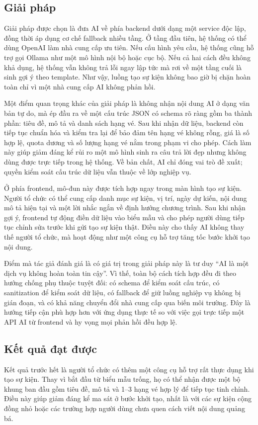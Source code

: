 \documentclass[../DoAn.tex]{subfiles}
\begin{document}
\subsection{Giải pháp}
Giải pháp được chọn là đưa AI về phía backend dưới dạng một service độc lập, đồng thời áp dụng cơ chế fallback nhiều tầng. Ở tầng đầu tiên, hệ thống có thể dùng OpenAI làm nhà cung cấp ưu tiên. Nếu cấu hình yêu cầu, hệ thống cũng hỗ trợ gọi Ollama như một mô hình nội bộ hoặc cục bộ. Nếu cả hai cách đều không khả dụng, hệ thống vẫn không trả lỗi ngay lập tức mà rơi về một tầng cuối là sinh gợi ý theo template. Như vậy, luồng tạo sự kiện không bao giờ bị chặn hoàn toàn chỉ vì một nhà cung cấp AI không phản hồi.

Một điểm quan trọng khác của giải pháp là không nhận nội dung AI ở dạng văn bản tự do, mà ép đầu ra về một cấu trúc \gls{JSON} có schema rõ ràng gồm ba thành phần: tiêu đề, mô tả và danh sách hạng vé. Sau khi nhận dữ liệu, backend còn tiếp tục chuẩn hóa và kiểm tra lại để bảo đảm tên hạng vé không rỗng, giá là số hợp lệ, quota dương và số lượng hạng vé nằm trong phạm vi cho phép. Cách làm này giúp giảm đáng kể rủi ro một mô hình sinh ra câu trả lời đẹp nhưng không dùng được trực tiếp trong hệ thống. Về bản chất, AI chỉ đóng vai trò đề xuất; quyền kiểm soát cấu trúc dữ liệu vẫn thuộc về lớp nghiệp vụ.

Ở phía frontend, mô-đun này được tích hợp ngay trong màn hình tạo sự kiện. Người tổ chức có thể cung cấp danh mục sự kiện, vị trí, ngày dự kiến, nội dung mô tả hiện tại và một lời nhắc ngắn về định hướng chương trình. Sau khi nhận gợi ý, frontend tự động điền dữ liệu vào biểu mẫu và cho phép người dùng tiếp tục chỉnh sửa trước khi gửi tạo sự kiện thật. Điều này cho thấy AI không thay thế người tổ chức, mà hoạt động như một công cụ hỗ trợ tăng tốc bước khởi tạo nội dung.

Điểm mà tác giả đánh giá là có giá trị trong giải pháp này là tư duy “AI là một dịch vụ không hoàn toàn tin cậy”. Vì thế, toàn bộ cách tích hợp đều đi theo hướng chống phụ thuộc tuyệt đối: có schema để kiểm soát cấu trúc, có sanitization để kiểm soát dữ liệu, có fallback để giữ luồng nghiệp vụ không bị gián đoạn, và có khả năng chuyển đổi nhà cung cấp qua biến môi trường. Đây là hướng tiếp cận phù hợp hơn với ứng dụng thực tế so với việc gọi trực tiếp một API AI từ frontend và hy vọng mọi phản hồi đều hợp lệ.

\subsection{Kết quả đạt được}
Kết quả trước hết là người tổ chức có thêm một công cụ hỗ trợ rất thực dụng khi tạo sự kiện. Thay vì bắt đầu từ biểu mẫu trống, họ có thể nhận được một bộ khung ban đầu gồm tiêu đề, mô tả và 1--3 hạng vé hợp lý để tiếp tục tinh chỉnh. Điều này giúp giảm đáng kể ma sát ở bước khởi tạo, nhất là với các sự kiện cộng đồng nhỏ hoặc các trường hợp người dùng chưa quen cách viết nội dung quảng bá.
\end{document}
